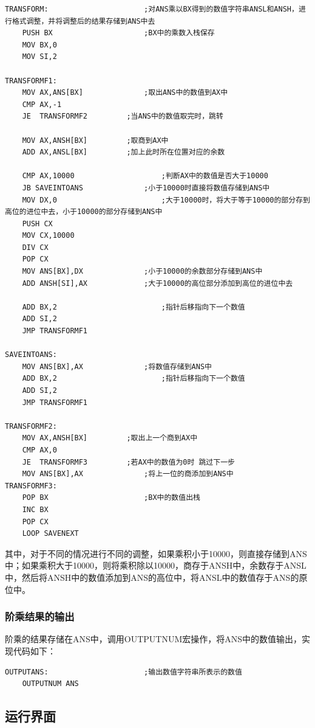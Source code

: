 \documentclass[UTF8,12pt]{article}
\begin{document}
\begin{lstlisting}[title=格式调整,frame=shadowbox]
    TRANSFORM:						;对ANS乘以BX得到的数值字符串ANSL和ANSH，进行格式调整，并将调整后的结果存储到ANS中去
	PUSH BX						;BX中的乘数入栈保存	
	MOV BX,0
	MOV SI,2
	
TRANSFORMF1:
	MOV AX,ANS[BX]				;取出ANS中的数值到AX中
	CMP AX,-1
	JE	TRANSFORMF2			;当ANS中的数值取完时，跳转
	
	MOV AX,ANSH[BX]		    ;取商到AX中
	ADD AX,ANSL[BX]		   	;加上此时所在位置对应的余数
	
	CMP AX,10000					;判断AX中的数值是否大于10000
	JB SAVEINTOANS				;小于10000时直接将数值存储到ANS中
	MOV DX,0						;大于10000时，将大于等于10000的部分存到高位的进位中去，小于10000的部分存储到ANS中
	PUSH CX
	MOV CX,10000
	DIV CX
	POP	CX
	MOV ANS[BX],DX				;小于10000的余数部分存储到ANS中
	ADD ANSH[SI],AX				;大于10000的高位部分添加到高位的进位中去
	
	ADD BX,2						;指针后移指向下一个数值
	ADD SI,2
	JMP	TRANSFORMF1
	
SAVEINTOANS:	
	MOV ANS[BX],AX				;将数值存储到ANS中
	ADD BX,2						;指针后移指向下一个数值
	ADD SI,2
	JMP	TRANSFORMF1
	
TRANSFORMF2:
	MOV AX,ANSH[BX]			;取出上一个商到AX中
	CMP AX,0
	JE	TRANSFORMF3			;若AX中的数值为0时 跳过下一步
	MOV ANS[BX],AX				;将上一位的商添加到ANS中
TRANSFORMF3:
	POP	BX						;BX中的数值出栈
	INC BX
	POP CX
	LOOP SAVENEXT
\end{lstlisting}

其中，对于不同的情况进行不同的调整，如果乘积小于10000，则直接存储到ANS中；如果乘积大于10000，则将乘积除以10000，商存于ANSH中，余数存于ANSL中，然后将ANSH中的数值添加到ANS的高位中，将ANSL中的数值存于ANS的原位中。

\subsubsection{阶乘结果的输出}
阶乘的结果存储在ANS中，调用OUTPUTNUM宏操作，将ANS中的数值输出，实现代码如下：

\begin{lstlisting}[title=阶乘结果的输出,frame=shadowbox]
    OUTPUTANS:						;输出数值字符串所表示的数值
	OUTPUTNUM ANS
\end{lstlisting}

\newpage

\subsection{运行界面}
\end{document}
